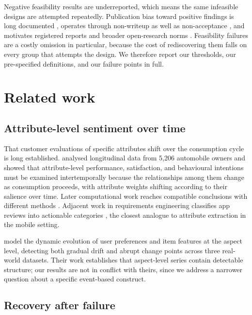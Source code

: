 \documentclass[11pt,a4paper]{article}
\makeatletter
\let\original@section\section
\renewcommand{\section}{\FloatBarrier\original@section}%
\let\original@subsection\subsection
\renewcommand{\subsection}{\FloatBarrier\original@subsection}%
\makeatother
\begin{document}
Negative feasibility results are underreported, which means the same
infeasible designs are attempted repeatedly. Publication bias toward positive
findings is long documented \citep{rosenthal1979, easterbrook1991, fanelli2010}, operates through non-writeup as well as non-acceptance
\citep{franco2014}, and motivates registered reports \citep{chambers2013} and
broader open-research norms \citep{nosek2015, ioannidis2005}. Feasibility
failures are a costly omission in particular, because the cost of
rediscovering them falls on every group that attempts the design. We therefore report our thresholds, our pre-specified definitions, and our
failure points in full.

\section{Related work}

\subsection{Attribute-level sentiment over time}

That customer evaluations of specific attributes shift over the consumption
cycle is long established. \citet{mittal1999} analysed longitudinal data from
5{,}206 automobile owners and showed that attribute-level performance,
satisfaction, and behavioural intentions must be examined intertemporally
because the relationships among them change as consumption proceeds, with
attribute weights shifting according to their salience over time. Later
computational work reaches compatible conclusions with different
methods \citep{park2024, roelen2023}. Adjacent work in requirements
engineering classifies app reviews into actionable categories
\citep{maalej2015}, the closest analogue to attribute extraction in the mobile
setting.

\citet{xia2021} model the dynamic evolution of user preferences and item
features at the aspect level, detecting both gradual drift and abrupt change
points across three real-world datasets. Their work establishes that
aspect-level series contain detectable structure; our results are not in
conflict with theirs, since we address a narrower question about a specific
event-based construct.

\subsection{Recovery after failure}
\end{document}
